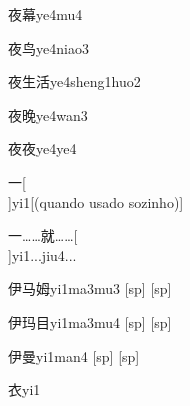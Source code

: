 \begin{verbete}[8;13]{夜幕}{ye4mu4}
\end{verbete}

\begin{verbete}[8;5]{夜鸟}{ye4niao3}
\end{verbete}

\begin{verbete}[8;5;9]{夜生活}{ye4sheng1huo2}
\end{verbete}

\begin{verbete}[8;11]{夜晚}{ye4wan3}
\end{verbete}

\begin{verbete}[8;8]{夜夜}{ye4ye4}
\end{verbete}

\begin{verbete}[1]{一}[\\]{yi1}[(quando usado sozinho)]
\end{verbete}

\begin{verbete}[1;12]{一……就……}[\\]{yi1...jiu4...}
\end{verbete}

\begin{verbete*}[6;3;8]{伊马姆}{yi1ma3mu3}
  [sp]
  [sp]
\end{verbete*}

\begin{verbete*}[6;7;5]{伊玛目}{yi1ma3mu4}
  [sp]
  [sp]
\end{verbete*}

\begin{verbete*}[6;11]{伊曼}{yi1man4}
  [sp]
  [sp]
\end{verbete*}

\begin{verbete}[6]{衣}{yi1}
\end{verbete}

